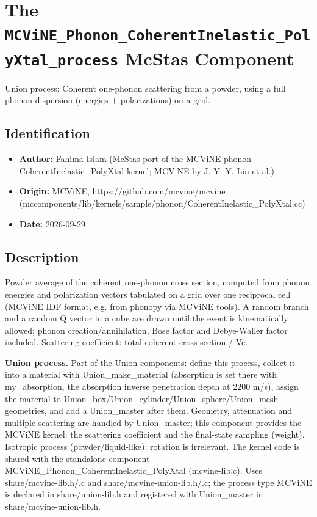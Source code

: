 \section{The \texttt{MCViNE\_Phonon\_CoherentInelastic\_PolyXtal\_process} McStas Component}
Union process: Coherent one-phonon scattering from a powder, using a full phonon dispersion (energies + polarizations) on a grid.

\subsection*{Identification}
\begin{itemize}
  \item \textbf{Author:} Fahima Islam (McStas port of the MCViNE phonon CoherentInelastic\_PolyXtal kernel; MCViNE by J. Y. Y. Lin et al.)
  \item \textbf{Origin:} MCViNE, https://github.com/mcvine/mcvine (mccomponents/lib/kernels/sample/phonon/CoherentInelastic\_PolyXtal.cc)
  \item \textbf{Date:} 2026-09-29
\end{itemize}

\subsection*{Description}
Powder average of the coherent one-phonon cross section, computed from phonon energies and polarization vectors tabulated on a grid over one reciprocal cell (MCViNE IDF format, e.g. from phonopy via MCViNE tools). A random branch and a random Q vector in a cube are drawn until the event is kinematically allowed; phonon creation/annihilation, Bose factor and Debye-Waller factor included. Scattering coefficient: total coherent cross section / Vc.

\textbf{Union process.} Part of the Union components: define this process, collect it into a material with Union\_make\_material (absorption is set there with my\_absorption, the absorption inverse penetration depth at 2200 m/s), assign the material to Union\_box/Union\_cylinder/Union\_sphere/Union\_mesh geometries, and add a Union\_master after them. Geometry, attenuation and multiple scattering are handled by Union\_master; this component provides the MCViNE kernel: the scattering coefficient and the final-state sampling (weight). Isotropic process (powder/liquid-like); rotation is irrelevant. The kernel code is shared with the standalone component MCViNE\_Phonon\_CoherentInelastic\_PolyXtal (mcvine-lib.c). Uses share/mcvine-lib.h/.c and share/mcvine-union-lib.h/.c; the process type MCViNE is declared in share/union-lib.h and registered with Union\_master in share/mcvine-union-lib.h.

